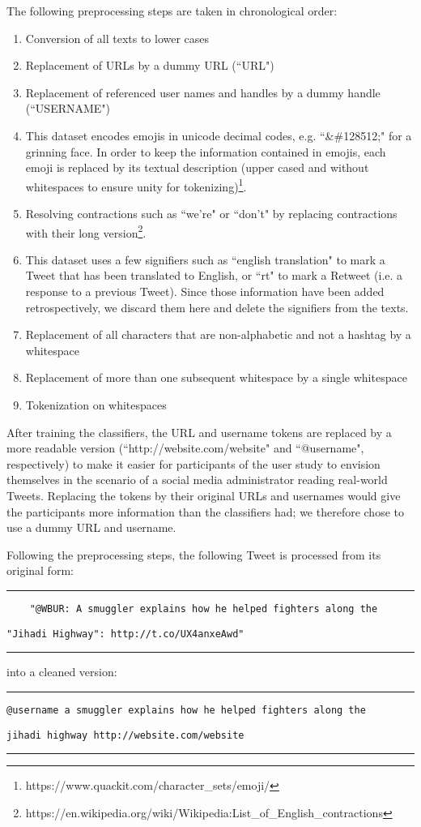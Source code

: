 The following preprocessing steps are taken in chronological order:
\begin{enumerate}
	\item Conversion of all texts to lower cases
	\item Replacement of URLs by a dummy URL (``URL")
	\item Replacement of referenced user names and handles by a dummy handle (``USERNAME")
	\item This dataset encodes emojis in unicode decimal codes, e.g. ``\&\#128512;" for a grinning face. In order to keep the information contained in emojis, each emoji is replaced by its textual description (upper cased and without whitespaces to ensure unity for tokenizing)\footnote{https://www.quackit.com/character\_sets/emoji/}.
	\item Resolving contractions such as ``we're" or ``don't" by replacing contractions with their long version\footnote{https://en.wikipedia.org/wiki/Wikipedia:List\_of\_English\_contractions}.
	\item This dataset uses a few signifiers such as ``english translation" to mark a Tweet that has been translated to English, or ``rt" to mark a Retweet (i.e. a response to a previous Tweet). Since those information have been added retrospectively, we discard them here and delete the signifiers from the texts.
	\item Replacement of all characters that are non-alphabetic and not a hashtag by a whitespace
	\item Replacement of more than one subsequent whitespace by a single whitespace
	\item Tokenization on whitespaces
\end{enumerate}
After training the classifiers, the URL and username tokens are replaced by a more readable version (``http://website.com/website" and ``@username", respectively) to make it easier for participants of the user study to envision themselves in the scenario of a social media administrator reading real-world Tweets. Replacing the tokens by their original URLs and usernames would give the participants more information than the classifiers had; we therefore chose to use a dummy URL and username.\medskip\newline

Following the preprocessing steps, the following Tweet is processed from its original form:
\medskip \hrule \medskip
\begin{verbatim}
	"@WBUR: A smuggler explains how he helped fighters along the \end{verbatim}\begin{verbatim}"Jihadi Highway": http://t.co/UX4anxeAwd"
\end{verbatim}
\medskip \hrule \medskip
into a cleaned version:
\medskip \hrule \medskip
\begin{verbatim}
@username a smuggler explains how he helped fighters along the \end{verbatim}\begin{verbatim}jihadi highway http://website.com/website
\end{verbatim}
\medskip \hrule \medskip





